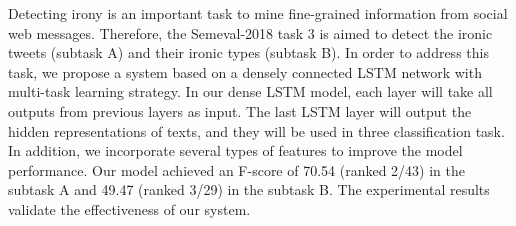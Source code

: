 Detecting irony is an important task to mine fine-grained information from social web messages. Therefore, the Semeval-2018 task 3 is aimed to detect the ironic tweets (subtask A) and their ironic types (subtask B). In order to address this task, we propose a system based on a densely connected LSTM network with multi-task learning strategy. In our dense LSTM model, each layer will take all outputs from previous layers as input. The last LSTM layer will output the hidden representations of texts, and they will be used in three classification task. In addition, we incorporate several types of features to improve the model performance. Our model achieved an F-score of 70.54 (ranked 2/43) in the subtask A and 49.47 (ranked 3/29) in the subtask B. The experimental results validate the effectiveness of our system.
